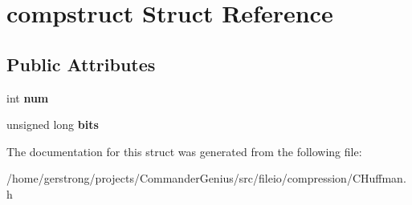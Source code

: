 \hypertarget{structcompstruct}{
\section{compstruct Struct Reference}
\label{structcompstruct}
}
\subsection*{Public Attributes}
\begin{DoxyCompactItemize}
\item 
\hypertarget{structcompstruct_a64214fcf691b7e0397a4a71bc25ce653}{
int {\bfseries num}}
\label{structcompstruct_a64214fcf691b7e0397a4a71bc25ce653}

\item 
\hypertarget{structcompstruct_aa821e61df92f156dbd651be88c5c675a}{
unsigned long {\bfseries bits}}
\label{structcompstruct_aa821e61df92f156dbd651be88c5c675a}

\end{DoxyCompactItemize}


The documentation for this struct was generated from the following file:\begin{DoxyCompactItemize}
\item 
/home/gerstrong/projects/CommanderGenius/src/fileio/compression/CHuffman.h\end{DoxyCompactItemize}
